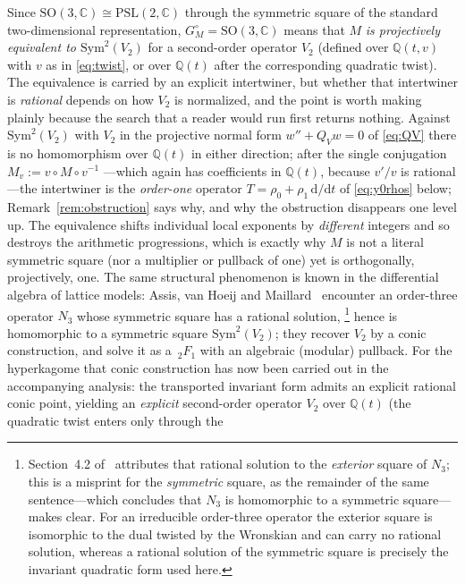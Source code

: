 \documentclass[cntp]{ipart}
\newcommand{\rmd}{\mathrm{d}}
\theoremstyle{plain}
\theoremstyle{remark}
\begin{document}
Since $\mathrm{SO}(3,\mathbb{C})\cong\mathrm{PSL}(2,\mathbb{C})$ through the symmetric square of the standard
two-dimensional representation, $G_M^\circ=\mathrm{SO}(3,\mathbb{C})$ means that $M$ \emph{is projectively equivalent
to $\mathrm{Sym}^2(V_2)$} for a second-order operator $V_2$ (defined over $\mathbb{Q}(t,v)$ with $v$ as in
\eqref{eq:twist}, or over $\mathbb{Q}(t)$ after the corresponding quadratic twist). The equivalence is carried by
an explicit intertwiner, but whether that intertwiner is \emph{rational} depends on how $V_2$ is normalized, and
the point is worth making plainly because the search that a reader would run first returns nothing. Against
$\mathrm{Sym}^2(V_2)$ with $V_2$ in the projective normal form $w''+Q_Vw=0$ of \eqref{eq:QV} there is no
homomorphism over $\mathbb{Q}(t)$ in either direction; after the single conjugation $M_v:=v\circ M\circ v^{-1}$
---which again has coefficients in $\mathbb{Q}(t)$, because $v'/v$ is rational---the intertwiner is the
\emph{order-one} operator $T=\rho_0+\rho_1\,\rmd/\rmd t$ of \eqref{eq:y0rhos} below; Remark~\ref{rem:obstruction}
says why, and why the obstruction disappears one level up.
The equivalence shifts individual local exponents by \emph{different} integers and so destroys
the arithmetic progressions, which is exactly why $M$ is not a literal symmetric square (nor a multiplier or
pullback of one) yet is orthogonally, projectively, one. The same structural phenomenon is known in the differential
algebra of lattice models: Assis, van Hoeij and Maillard~\cite{AVM2016} encounter an order-three operator $N_3$
whose symmetric square has a rational solution,%
\footnote{Section~4.2 of~\cite{AVM2016} attributes that rational solution to the \emph{exterior} square of
$N_3$; this is a misprint for the \emph{symmetric} square, as the remainder of the same sentence---which
concludes that $N_3$ is homomorphic to a symmetric square---makes clear. For an irreducible order-three
operator the exterior square is isomorphic to the dual twisted by the Wronskian and can carry no rational
solution, whereas a rational solution of the symmetric square is precisely the invariant quadratic form used
here.}
hence is homomorphic to a symmetric square $\mathrm{Sym}^2(V_2)$; they recover $V_2$ by a conic construction,
and solve it as a $\,_2F_1$ with an algebraic (modular) pullback. For the hyperkagome that conic construction has now been carried
out in the accompanying analysis: the transported invariant form admits an explicit rational conic point, yielding
an \emph{explicit} second-order operator $V_2$ over $\mathbb{Q}(t)$ (the quadratic twist enters only through the
\end{document}
